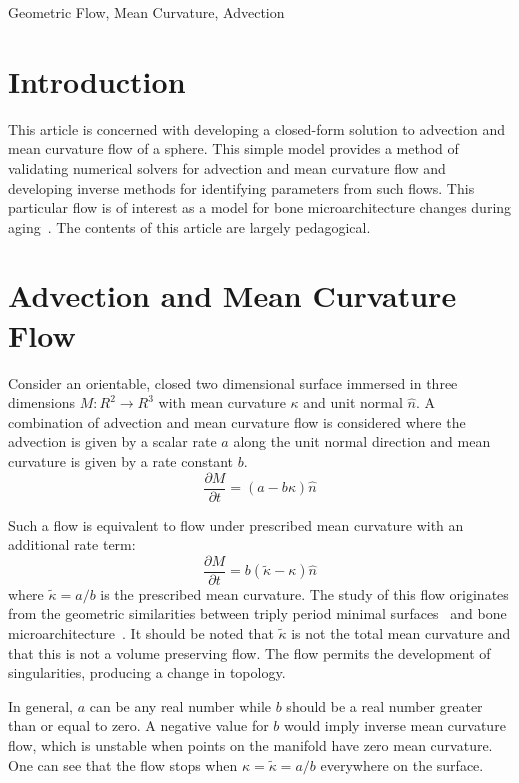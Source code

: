 \documentclass[journal]{IEEEtran}
\begin{document}
\begin{IEEEkeywords}
Geometric Flow, Mean Curvature, Advection
\end{IEEEkeywords}

\section{Introduction}
This article is concerned with developing a closed-form solution to advection and mean curvature flow of a sphere.
This simple model provides a method of validating numerical solvers for advection and mean curvature flow and developing inverse methods for identifying parameters from such flows.
This particular flow is of interest as a model for bone microarchitecture changes during aging~\cite{besler2018bone}.
The contents of this article are largely pedagogical.

\section{Advection and Mean Curvature Flow}
Consider an orientable, closed two dimensional surface immersed in three dimensions $M \colon \!R^2 \rightarrow \!R^3$ with mean curvature $\kappa$ and unit normal $\hat{n}$.
A combination of advection and mean curvature flow is considered where the advection is given by a scalar rate $a$ along the unit normal direction and mean curvature is given by a rate constant $b$.
\begin{equation}
  \label{eqn:advection-mean}
  \frac{\partial M}{\partial t} = (a - b \kappa) \hat{n}
\end{equation}

Such a flow is equivalent to flow under prescribed mean curvature with an additional rate term:
\begin{equation}
  \frac{\partial M}{\partial t} = b(\tilde{\kappa} - \kappa) \hat{n}
\end{equation}
where $\tilde{\kappa} = a/b$ is the prescribed mean curvature.
The study of this flow originates from the geometric similarities between triply period minimal surfaces~\cite{schoen1970infinite,anderson1987periodic,chopp1993flow} and bone microarchitecture~\cite{hildebrand1999direct}.
It should be noted that $\tilde{\kappa}$ is not the total mean curvature and that this is not a volume preserving flow.
The flow permits the development of singularities, producing a change in topology.

In general, $a$ can be any real number while $b$ should be a real number greater than or equal to zero.
A negative value for $b$ would imply inverse mean curvature flow, which is unstable when points on the manifold have zero mean curvature.
One can see that the flow stops when $\kappa = \tilde{\kappa} = a/b$ everywhere on the surface.
\end{document}
